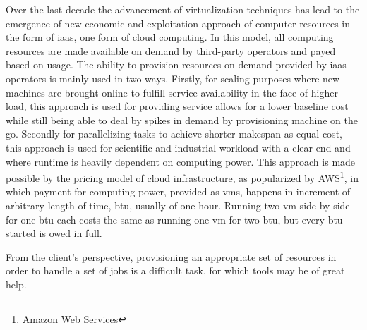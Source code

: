 \documentclass[10pt,conference,compsocconf]{IEEEtran}
\begin{document}
Over the  last decade the advancement  of virtualization techniques has  lead to
the emergence of new economic and exploitation approach of computer resources in
the form of \ac{iaas}, one form of cloud computing. In this model, all computing
resources are made available on demand  by third-party operators and payed based
on usage.   The ability to provision  resources on demand provided  by \ac{iaas}
operators is mainly  used in two ways.  Firstly, for  scaling purposes where new
machines  are brought  online to  fulfill service  availability in  the face  of
higher load,  this approach  is used  for providing service  allows for  a lower
baseline cost while still being able to deal by spikes in demand by provisioning
machine on the go.  Secondly for parallelizing tasks to achieve shorter makespan
as equal cost, this approach is used for scientific and industrial workload with
a clear  end and where  runtime is heavily  dependent on computing  power.  This
approach  is made  possible by  the pricing  model of  cloud infrastructure,  as
popularized by AWS\footnote{Amazon Web Services}, in which payment for computing
power, provided as  \acp{vm}, happens in increment of arbitrary  length of time,
\ac{btu}, usually of one hour. Running two \ac{vm} side by side for one \ac{btu}
each costs  the same  as running  one \ac{vm}  for two  \ac{btu}, but  every
\ac{btu} started is  owed in full.  

From the client's  perspective, provisioning an appropriate set  of resources in
order to  handle a set of  jobs is a difficult  task, for which tools  may be of
great help.   
\end{document}
